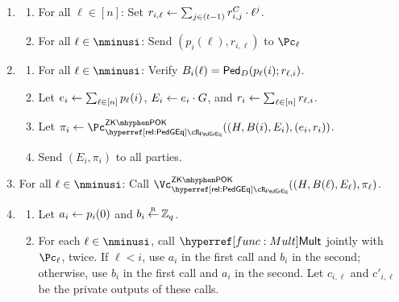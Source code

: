 \begin{protocol}
\begin{enumerate}
			\item  {}
			
			\begin{enumerate}
				\item For all $\ell \in [n]$: Set $r_{i,\ell} \leftarrow  \sum_{j\in (t-1)} r_{i,j}^C \cdot \ell^j$.   
				
				\item For all $\ell \in \nminusi$: Send $(p_i(\ell),r_{i,\ell})$ to $\Pc_\ell$
			\end{enumerate}
			
	
			
			
			\item 	{}
			
			\begin{enumerate}
				\item 	For all $\ell\in \nminusi$: Verify   $B_i(\ell) = \mathsf{Ped}_D(p_\ell(i);r_{\ell,i})$.
				
				\item Let $e_i \leftarrow  \sum_{\ell \in [n]} p_\ell(i)$, $E_i \leftarrow e_i \cdot G$, and $r_i 
				\leftarrow  \sum_{\ell \in [n]} r_{\ell,i}$.
				
				
				\item Let $\pi_i \asn \pZKPOK{\rPedGEq}((H,B(i),E_i),(e_i,r_i ))$.
				
				
				\item Send $(E_i,\pi_i)$ to all parties.
			\end{enumerate}
		
				
		\item For all $\ell\in \nminusi$: Call $\vZKPOK{\rPedGEq}((H,B(\ell),E_\ell),\pi_\ell)$.
		
		
		
		\item 	{}
		

		\begin{enumerate}
			
			
			\item Let $a_i \leftarrow p_i(0)$ and $b_i \mathbin{\stackrel{\mbox{\tiny R}}{\leftarrow}} {\mathbb Z}_q$.
			
			\item For each $\ell \in \nminusi$, call $\Mult$ jointly with $\Pc_\ell$, twice. If $\ell < i$, use $a_i$ in the first call and $b_i$ in the second; otherwise, use  $b_i$ in the first call and $a_i$ in the second.    Let $c_{i,\ell}$ and $c'_{i,\ell}$ be the private  outputs of these calls.
			

\end{enumerate}
\end{enumerate}
\end{protocol}
